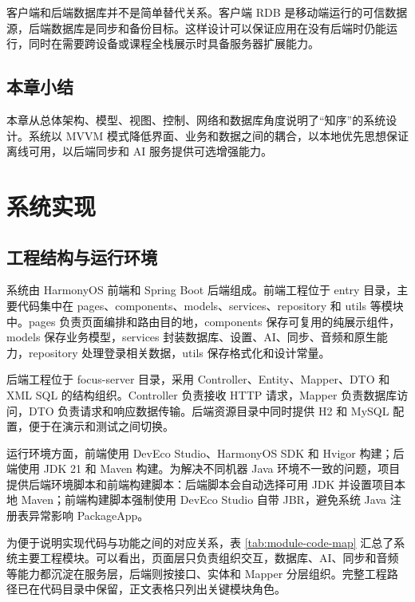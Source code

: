 客户端和后端数据库并不是简单替代关系。客户端 RDB 是移动端运行的可信数据源，后端数据库是同步和备份目标。这样设计可以保证应用在没有后端时仍能运行，同时在需要跨设备或课程全栈展示时具备服务器扩展能力。

\section{本章小结}

本章从总体架构、模型、视图、控制、网络和数据库角度说明了“知序”的系统设计。系统以 MVVM 模式降低界面、业务和数据之间的耦合，以本地优先思想保证离线可用，以后端同步和 AI 服务提供可选增强能力。

\chapter{系统实现}

\section{工程结构与运行环境}

系统由 HarmonyOS 前端和 Spring Boot 后端组成。前端工程位于 entry 目录，主要代码集中在 pages、components、models、services、repository 和 utils 等模块中。pages 负责页面编排和路由目的地，components 保存可复用的纯展示组件，models 保存业务模型，services 封装数据库、设置、AI、同步、音频和原生能力，repository 处理登录相关数据，utils 保存格式化和设计常量。

后端工程位于 focus-server 目录，采用 Controller、Entity、Mapper、DTO 和 XML SQL 的结构组织。Controller 负责接收 HTTP 请求，Mapper 负责数据库访问，DTO 负责请求和响应数据传输。后端资源目录中同时提供 H2 和 MySQL 配置，便于在演示和测试之间切换。

运行环境方面，前端使用 DevEco Studio、HarmonyOS SDK 和 Hvigor 构建；后端使用 JDK 21 和 Maven 构建。为解决不同机器 Java 环境不一致的问题，项目提供后端环境脚本和前端构建脚本：后端脚本会自动选择可用 JDK 并设置项目本地 Maven；前端构建脚本强制使用 DevEco Studio 自带 JBR，避免系统 Java 注册表异常影响 PackageApp。

为便于说明实现代码与功能之间的对应关系，表 \ref{tab:module-code-map} 汇总了系统主要工程模块。可以看出，页面层只负责组织交互，数据库、AI、同步和音频等能力都沉淀在服务层，后端则按接口、实体和 Mapper 分层组织。完整工程路径已在代码目录中保留，正文表格只列出关键模块角色。

